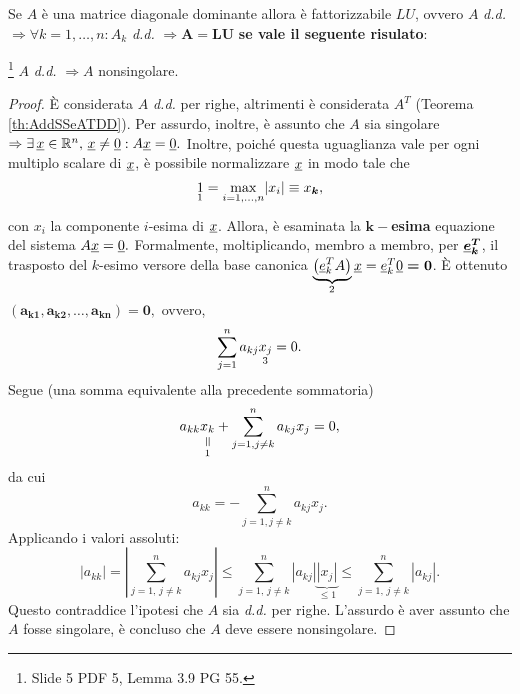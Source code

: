 Se $A$ è una matrice diagonale dominante allora è fattorizzabile $LU$, ovvero $A$ \textit{d.d.} $\Rightarrow\forall k=1,\hdots,n:A_k$ \textit{d.d.} $\Rightarrow \boldsymbol{A=LU}$ \textbf{se vale il seguente risulato}:
\begin{theorem}\label{th:matrDDNonSing}\footnote{Slide 5 PDF 5, Lemma 3.9 PG 55.}
    $A$ \textit{d.d.} $\Rightarrow A$ nonsingolare.
\end{theorem}
\begin{proof}
    È considerata $A$ \textit{d.d.} per righe, altrimenti è considerata $A^T$ (Teorema \ref{th:AddSSeATDD}). Per assurdo, inoltre, è assunto che $A$ sia singolare $\Rightarrow\exists\,\uline x\in\mathbb R^n,\, \uline x\neq\uline 0: A\uline x=\uline 0.$ Inoltre, poiché questa uguaglianza vale per ogni multiplo scalare di $\uline x$, è possibile normalizzare $\uline x$ in modo tale che 
    \begin{equation}\label{eq:normX}
        \underset{\footnotemark}{1} = \underset{i=1,\hdots,n}{\max}|x_i|\equiv x_{\boldsymbol k},
    \end{equation}
    con $x_i$ la componente $i$-esima di $\uline x$. Allora, è esaminata la $\boldsymbol{k-}$\textbf{esima} equazione del sistema $A\uline x=\uline 0.$ Formalmente, moltiplicando, membro a membro, per $\boldsymbol{\uline e_k^T}$, il trasposto del $k$-esimo versore della base canonica $\underbrace{\left(\uline e_k^T A\right)}_{\footnotemark}\uline x=\uline e_k^T\uline 0\boldsymbol{=0}$.
    È ottenuto $\boldsymbol{(a_{k1}, a_{k2},\hdots, a_{kn})=0},$ ovvero,
    \begin{equation*}
        \sum_{j=1}^n a_{kj}\underset{\footnotemark}{x_j}=0.
    \end{equation*}
    Segue (una somma equivalente alla precedente sommatoria)
    \begin{equation*}
        a_{kk}\equalto{x_k}{1} +  \sum_{j=1, j\neq k}^n a_{kj}x_j=0,
    \end{equation*}
    da cui
    \begin{equation*}
        a_{kk}= -\sum_{j=1, j\neq k}^n a_{kj}x_j.
    \end{equation*}
    Applicando i valori assoluti:
    \begin{equation*}
        |a_{kk}|=\left|\sum_{j=1,\, j\neq k}^n a_{kj}x_j\right|\leq \sum_{j=1,\, j\neq k}^n |a_{kj}|\underbrace{|x_j|}_{\leq 1}\leq \sum_{j=1,\, j\neq k}^n |a_{kj}|.
    \end{equation*}
    Questo contraddice l'ipotesi che $A$ sia \textit{d.d.} per righe. L'assurdo è aver assunto che $A$ fosse singolare, è concluso che $A$ deve essere nonsingolare.
\end{proof}

